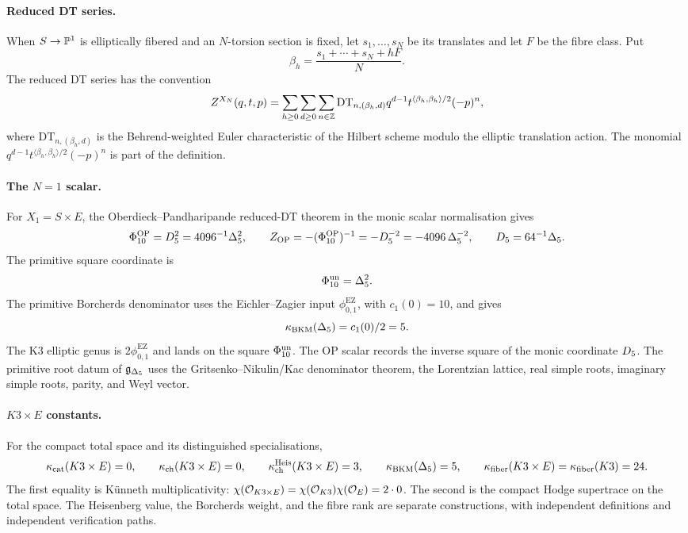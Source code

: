 \paragraph{Reduced DT series.}
When \(S\to\mathbb{P}^1\) is elliptically fibered and an \(N\)-torsion section
is fixed, let \(s_1,\ldots,s_N\) be its translates and let \(F\) be the
fibre class. Put
\[
  \beta_h=\frac{s_1+\cdots+s_N+hF}{N}.
\]
The reduced DT series has the convention
\[
  Z^{X_N}(q,t,p)
  =
  \sum_{h\geq0}\sum_{d\geq0}\sum_{n\in\mathbb{Z}}
  \mathrm{DT}_{n,(\beta_h,d)}
  q^{d-1}t^{\langle\beta_h,\beta_h\rangle/2}(-p)^n ,
\]
where \(\mathrm{DT}_{n,(\beta_h,d)}\) is the Behrend-weighted Euler
characteristic of the Hilbert scheme modulo the elliptic translation
action. The monomial \(q^{d-1}t^{\langle\beta_h,\beta_h\rangle/2}(-p)^n\)
is part of the definition.

\paragraph{The \(N=1\) scalar.}
For \(X_1=S\times E\), the Oberdieck--Pandharipande reduced-DT theorem
in the monic scalar normalisation gives
\[
  \Phi_{10}^{\mathrm{OP}}=D_5^2=4096^{-1}\Delta_5^2,
  \qquad
  Z_{\mathrm{OP}}=-(\Phi_{10}^{\mathrm{OP}})^{-1}
  =-D_5^{-2}=-4096\,\Delta_5^{-2},
  \qquad
  D_5=64^{-1}\Delta_5 .
\]
The primitive square coordinate is
\[
  \Phi_{10}^{\mathrm{un}}=\Delta_5^2 .
\]
The primitive Borcherds denominator uses the Eichler--Zagier input
\(\phi_{0,1}^{\mathrm{EZ}}\), with \(c_1(0)=10\), and gives
\[
  \kappa_{\mathrm{BKM}}(\Delta_5)=c_1(0)/2=5 .
\]
The K3 elliptic genus is \(2\phi_{0,1}^{\mathrm{EZ}}\) and lands on the
square \(\Phi_{10}^{\mathrm{un}}\). The OP scalar records the inverse square of the
monic coordinate \(D_5\). The primitive root datum of \(\mathfrak{g}_{\Delta_5}\)
uses the Gritsenko--Nikulin/Kac denominator theorem, the Lorentzian
lattice, real simple roots, imaginary simple roots, parity, and Weyl
vector.

\paragraph{\(K3\times E\) constants.}
For the compact total space and its distinguished specialisations,
\[
  \kappa_{\mathrm{cat}}(K3\times E)=0,\qquad
  \kappa_{\mathrm{ch}}(K3\times E)=0,\qquad
  \kappa_{\mathrm{ch}}^{\mathrm{Heis}}(K3\times E)=3,\qquad
  \kappa_{\mathrm{BKM}}(\Delta_5)=5,\qquad
  \kappa_{\mathrm{fiber}}(K3\times E)=\kappa_{\mathrm{fiber}}(K3)=24 .
\]
The first equality is K\"unneth multiplicativity:
\(\chi(\mathcal{O}_{K3\times E})=\chi(\mathcal{O}_{K3})\chi(\mathcal{O}_E)=2\cdot0\).
The second is the compact Hodge supertrace on the total space. The
Heisenberg value, the Borcherds weight, and the fibre rank are separate
constructions, with independent definitions and independent verification
paths.

